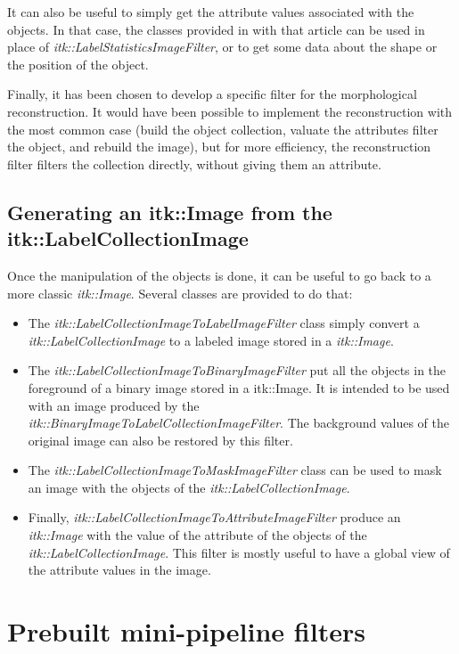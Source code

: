 \documentclass{InsightArticle}
\begin{document}
It can also be useful to simply get the attribute values associated with the
objects. In that case, the classes provided in with that article can be used in
place of {\em itk::LabelStatisticsImageFilter}, or to get some data about the
shape or the position of the object.

Finally, it has been chosen to develop a specific filter for the morphological
reconstruction. It would have been possible to implement the reconstruction
with the most common case (build the object collection, valuate the attributes
filter the object, and rebuild the image), but for more efficiency, the reconstruction
filter filters the collection directly, without giving them an attribute.

\subsection{Generating an itk::Image from the itk::LabelCollectionImage}

Once the manipulation of the objects is done, it can be useful to go back to a
more classic {\em itk::Image}. Several classes are provided to do that:
\begin{itemize}
  \item The {\em itk::LabelCollectionImageToLabelImageFilter} class simply
convert a {\em itk::LabelCollectionImage} to a labeled image stored in a {\em
itk::Image}.
  \item The {\em itk::LabelCollectionImageToBinaryImageFilter} put all the
objects in the foreground of a binary image stored in a {itk::Image}. It is
intended to be used with an image produced by the {\em
itk::BinaryImageToLabelCollectionImageFilter}. The background values of the
original image can also be restored by this filter.
  \item The {\em itk::LabelCollectionImageToMaskImageFilter} class can be used
to mask an image with the objects of the {\em itk::LabelCollectionImage}.
  \item Finally, {\em itk::LabelCollectionImageToAttributeImageFilter} produce
an {\em itk::Image} with the value of the attribute of the objects of the {\em
itk::LabelCollectionImage}. This filter is mostly useful to have a global view
of the attribute values in the image.
\end{itemize}

\section{Prebuilt mini-pipeline filters}
\end{document}
